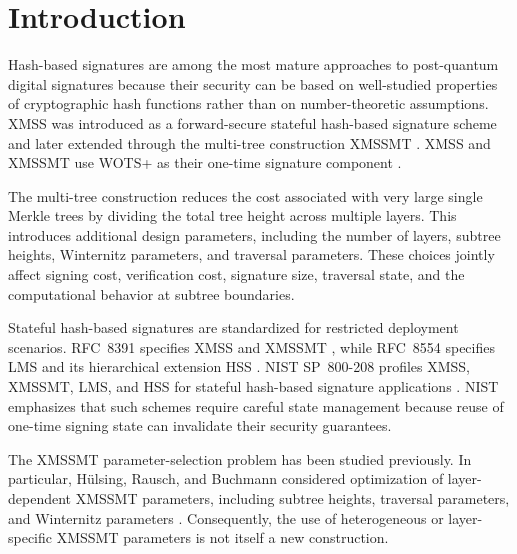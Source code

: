 \documentclass[pdflatex,sn-mathphys-num]{sn-jnl}
\begin{document}

\maketitle

\section{Introduction}
\label{sec:introduction}

Hash-based signatures are among the most mature approaches to
post-quantum digital signatures because their security can be based on
well-studied properties of cryptographic hash functions rather than on
number-theoretic assumptions. XMSS was introduced as a forward-secure
stateful hash-based signature scheme and later extended through the
multi-tree construction XMSSMT
\cite{Buchmann2011XMSS,RFC8391}. XMSS and XMSSMT use WOTS+ as their
one-time signature component \cite{Huelsing2013WOTSPlus,RFC8391}.

The multi-tree construction reduces the cost associated with very large
single Merkle trees by dividing the total tree height across multiple
layers. This introduces additional design parameters, including the
number of layers, subtree heights, Winternitz parameters, and traversal
parameters. These choices jointly affect signing cost, verification
cost, signature size, traversal state, and the computational behavior
at subtree boundaries.

Stateful hash-based signatures are standardized for restricted
deployment scenarios. RFC~8391 specifies XMSS and XMSSMT
\cite{RFC8391}, while RFC~8554 specifies LMS and its hierarchical
extension HSS \cite{RFC8554}. NIST SP~800-208 profiles XMSS, XMSSMT,
LMS, and HSS for stateful hash-based signature applications
\cite{NIST800208}. NIST emphasizes that such schemes require careful
state management because reuse of one-time signing state can invalidate
their security guarantees.

The XMSSMT parameter-selection problem has been studied previously.
In particular, H{\"u}lsing, Rausch, and Buchmann considered optimization
of layer-dependent XMSSMT parameters, including subtree heights,
traversal parameters, and Winternitz parameters
\cite{OptimalParametersXMSSMT}. Consequently, the use of heterogeneous
or layer-specific XMSSMT parameters is not itself a new construction.
\end{document}
